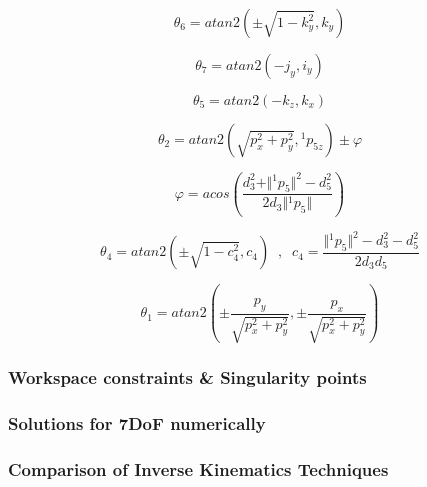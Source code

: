 \[
θ_6 = atan2 \left( \pm \sqrt{1-k_y^2}, k_y \right)
\]

\[
θ_7 = atan2 \left( -j_y, i_y \right)
\]

\[
θ_5 = atan2 \left( - k_z, k_x \right)
\]

\[
θ_2 = atan2 \left( \sqrt{p_x^2 + p_y^2}, {}^1p_{5z} \right) \pm φ
\]

\[
φ = acos \left( \frac{d_3^2 + \Vert{}^1p_{5}\Vert ^2 - d_5^2}{2d_3 \Vert{}^1p_{5}\Vert} \right)
\]

\[
θ_4 = atan2 \left( \pm \sqrt{1 - c_4^2}, c_4 \right) \;\; , \;\; c_4 = \frac{ \Vert{}^1p_{5}\Vert ^2 - d_3^2 - d_5^2 }{2d_3d_5}
\]

\[
θ_1 = atan2 \left( \pm \frac{p_y}{\sqrt{p_x^2 + p_y^2}} , \pm \frac{p_x}{\sqrt{p_x^2 + p_y^2}} \right)
\]

\subsubsection{Workspace constraints \& Singularity points}

\subsubsection{Solutions for 7DoF numerically}

\subsubsection{Comparison of Inverse Kinematics Techniques}
